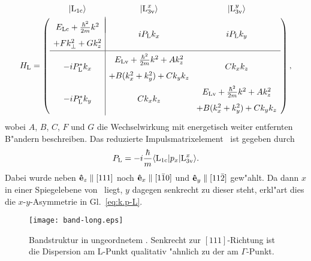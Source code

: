 \begin{equation}
\label{eq:k.p-L}
\renewcommand{\arraystretch}{1.6}
\setlength{\arraycolsep}{0.5ex}
\op{H_{\text{L}}} = \left(
\begin{array}{c|cc}
  \raisebox{2.0em}[0ex][0ex]{\ket{\LCB}} 
& \raisebox{2.0em}[0ex][0ex]{\ket{\LVBx}} 
& \raisebox{2.0em}[0ex][0ex]{\ket{\LVBy}} \\[-4ex]
\begin{array}[c]{c}
  E_{\text{Lc}} + \frac{\hbar^{2}}{2m} k^{2} \\ 
  + F k_{\perp}^{2} + G k_{z}^{2} 
\end{array}
& i\PL k_{x} 
& i\PL k_{y} \\
\hline
  -i\cc{\PL} k_{x} 
& \begin{array}[c]{c}
  E_{\text{Lv}} + \frac{\hbar^{2}}{2m} k^{2} + A k_{z}^{2} \\
  + B (k_{x}^{2}+k_{y}^{2}) + C k_{y} k_{z}
\end{array}
& C k_{x} k_{z} \\
  -i\cc{\PL} k_{y} 
& C k_{x} k_{z} 
& \begin{array}[c]{c}
  E_{\text{Lv}} + \frac{\hbar^{2}}{2m} k^{2} + A k_{z}^{2} \\ 
  + B (k_{x}^{2}+k_{y}^{2}) + C k_{y} k_{z}
\end{array}\\
\end{array}\right),
\renewcommand{\arraystretch}{0.625}
\end{equation}
%
wobei $A$, $B$, $C$, $F$ und $G$ die Wechselwirkung mit energetisch weiter
entfernten B"andern beschreiben. Das reduzierte Impulsmatrixelement \PL\ ist
gegeben durch
%
\begin{displaymath}
  P_{\text{L}} =  - i \frac{\hbar}{m} \langle {\ensuremath{\text{L}_{1 \text{c}}}} | {\protect p_{x}} | {\text{L}^{x}_{3 \text{v}}} \rangle.
\end{displaymath}
%
Dabei wurde neben $\mathbf{\protect\hat e}_{z} \parallel [111]$ noch $\mathbf{\protect\hat e}_{x} \parallel [1 \bar{1} 0]$ und
$\mathbf{\protect\hat e}_{y} \parallel [1 1 \bar{2}]$ gew"ahlt. Da dann $x$ in einer Spiegelebene von
\Cdv\ liegt, $y$ dagegen senkrecht zu dieser steht, erkl"art dies die
$x$-$y$-Asymmetrie in Gl.~\eqref{eq:k.p-L}.
 
\begin{figure}[htb]
  \texttt{[image: band-long.eps]}
  \caption{Bandstruktur in ungeordnetem \GaInP. Senkrecht zur $[111]$-Richtung
    ist die Dispersion am L-Punkt qualitativ "ahnlich zu der am
    $\Gamma$-Punkt.} 
  \label{fig:band-long}
\end{figure}

